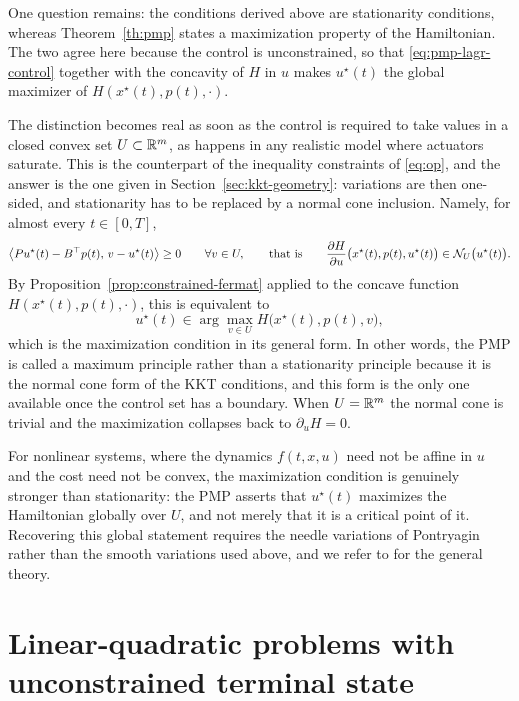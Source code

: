 One question remains: the conditions derived above are stationarity conditions, whereas Theorem~\ref{th:pmp} states a maximization property of the Hamiltonian. The two agree here because the control is unconstrained, so that \eqref{eq:pmp-lagr-control} together with the concavity of $H$ in $u$ makes $u^\star(t)$ the global maximizer of $H(x^\star(t),p(t),\cdot)$.

The distinction becomes real as soon as the control is required to take values in a closed convex set $U\subset\mathbb{R}^m$, as happens in any realistic model where actuators saturate. This is the counterpart of the inequality constraints of \eqref{eq:op}, and the answer is the one given in Section~\ref{sec:kkt-geometry}: variations are then one-sided, and stationarity has to be replaced by a normal cone inclusion. Namely, for almost every $t\in[0,T]$,
\begin{equation}
    \left\langle P u^\star(t) - B^\top p(t),\, v-u^\star(t) \right\rangle \ge 0
    \qquad \forall v\in U,
    \qquad\text{that is}\qquad
    \frac{\partial H}{\partial u}\big(x^\star(t),p(t),u^\star(t)\big) \in \mathcal{N}_U\big(u^\star(t)\big).
\end{equation}
By Proposition~\ref{prop:constrained-fermat} applied to the concave function $H(x^\star(t),p(t),\cdot)$, this is equivalent to
\begin{equation}
    u^\star(t) \in \arg\max_{v\in U} H\big(x^\star(t),p(t),v\big),
\end{equation}
which is the maximization condition in its general form. In other words, the PMP is called a maximum principle rather than a stationarity principle because it is the normal cone form of the KKT conditions, and this form is the only one available once the control set has a boundary. When $U=\mathbb{R}^m$ the normal cone is trivial and the maximization collapses back to $\partial_u H = 0$.

\begin{remark}
    For nonlinear systems, where the dynamics $f(t,x,u)$ need not be affine in $u$ and the cost need not be convex, the maximization condition is genuinely stronger than stationarity: the PMP asserts that $u^\star(t)$ maximizes the Hamiltonian globally over $U$, and not merely that it is a critical point of it. Recovering this global statement requires the needle variations of Pontryagin rather than the smooth variations used above, and we refer to \cite{agrachevControl2022,trelatControle2005} for the general theory.
\end{remark}

\section{Linear-quadratic problems with unconstrained terminal state}
\label{sec:lq-no-terminal}

